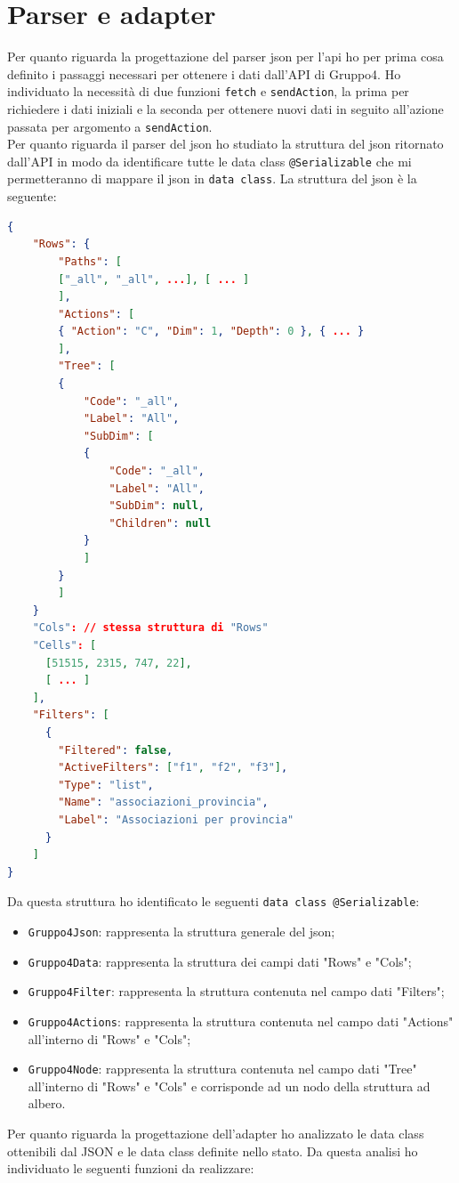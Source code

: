 \section{Parser e adapter}
Per quanto riguarda la progettazione del parser json per l'api ho per prima cosa definito i passaggi necessari per ottenere i dati dall'API di Gruppo4. Ho individuato la necessità di due funzioni \verb|fetch| e \verb|sendAction|, la prima per richiedere i dati iniziali e la seconda per ottenere nuovi dati in seguito all'azione passata per argomento a \verb|sendAction|. \\
Per quanto riguarda il parser del json ho studiato la struttura del json ritornato dall'API in modo da identificare tutte le data class \verb|@Serializable| che mi permetteranno di mappare il json in \verb|data class|. La struttura del json è la seguente:
\begin{lstlisting}[caption={Struttura JSON API}, label={lst:bodycells}, language=json]
{
	"Rows": {
		"Paths": [
		["_all", "_all", ...], [ ... ]
		],
		"Actions": [
		{ "Action": "C", "Dim": 1, "Depth": 0 }, { ... }
		],
		"Tree": [
		{
			"Code": "_all",
			"Label": "All",
			"SubDim": [
			{
				"Code": "_all",
				"Label": "All",
				"SubDim": null,
				"Children": null
			}
			]  
		}
		]
	}
	"Cols": // stessa struttura di "Rows"
	"Cells": [
	  [51515, 2315, 747, 22],
	  [ ... ]
	],
	"Filters": [
	  {
	    "Filtered": false,
	    "ActiveFilters": ["f1", "f2", "f3"],
	    "Type": "list",
	    "Name": "associazioni_provincia",
	    "Label": "Associazioni per provincia"
	  }
	]
}
\end{lstlisting}
Da questa struttura ho identificato le seguenti \verb|data class @Serializable|:
\begin{itemize}
	\item \verb|Gruppo4Json|: rappresenta la struttura generale del json;
	\item \verb|Gruppo4Data|: rappresenta la struttura dei campi dati "Rows" e "Cols";
	\item \verb|Gruppo4Filter|: rappresenta la struttura contenuta nel campo dati "Filters";
	\item \verb|Gruppo4Actions|: rappresenta la struttura contenuta nel campo dati "Actions" all'interno di "Rows" e "Cols";
	\item \verb|Gruppo4Node|: rappresenta la struttura contenuta nel campo dati "Tree" all'interno di "Rows" e "Cols" e corrisponde ad un nodo della struttura ad albero.
\end{itemize}
\noindent
Per quanto riguarda la progettazione dell'adapter ho analizzato le data class ottenibili dal JSON e le data class definite nello stato. Da questa analisi ho individuato le seguenti funzioni da realizzare:
